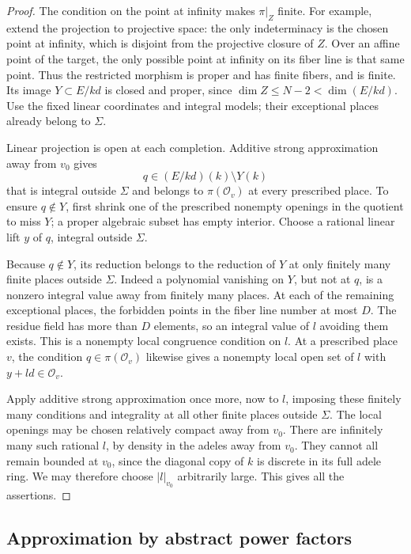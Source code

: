 \begin{proof}
The condition on the point at infinity makes \(\pi|_Z\) finite.
For example, extend the projection to projective space: the only
indeterminacy is the chosen point at infinity, which is disjoint
from the projective closure of \(Z\).  Over an affine point of the
target, the only possible point at infinity on its fiber line is
that same point.  Thus the restricted morphism is proper and has
finite fibers, and is finite.  Its image \(Y\subset E/kd\) is closed
and proper, since
\(\dim Z\leq N-2<\dim(E/kd)\).
Use the fixed linear coordinates and integral models; their
exceptional places already belong to \(\Sigma\).

Linear projection is open at each completion.  Additive strong
approximation away from \(v_0\) gives
\[
 q\in (E/kd)(k)\setminus Y(k)
\]
that is integral outside \(\Sigma\) and belongs to
\(\pi(\mathcal O_v)\) at every prescribed place.
To ensure \(q\notin Y\), first shrink one of the prescribed
nonempty openings in the quotient to miss \(Y\); a proper algebraic
subset has empty interior.  Choose a rational linear lift \(y\) of
\(q\), integral outside \(\Sigma\).

Because \(q\notin Y\), its reduction belongs to the reduction of
\(Y\) at only finitely many finite places outside \(\Sigma\).
Indeed a polynomial vanishing on \(Y\), but not at \(q\), is a
nonzero integral value away from finitely many places.
At each of the remaining exceptional places, the forbidden points
in the fiber line number at most \(D\).  The residue field has
more than \(D\) elements, so an integral value of \(l\) avoiding
them exists.  This is a nonempty local congruence condition on \(l\).
At a prescribed place \(v\), the condition \(q\in\pi(\mathcal O_v)\)
likewise gives a nonempty local open set of \(l\) with
\(y+ld\in\mathcal O_v\).

Apply additive strong approximation once more, now to \(l\), imposing
these finitely many conditions and integrality at all other finite
places outside \(\Sigma\).  The local openings may be chosen
relatively compact away from \(v_0\).  There are infinitely many
such rational \(l\), by density in the adeles away from \(v_0\).
They cannot all remain bounded at \(v_0\), since the diagonal
copy of \(k\) is discrete in its full adele ring.  We may therefore
choose \(|l|_{v_0}\) arbitrarily large.  This gives all the assertions.
\end{proof}

\subsection{Approximation by abstract power factors}

